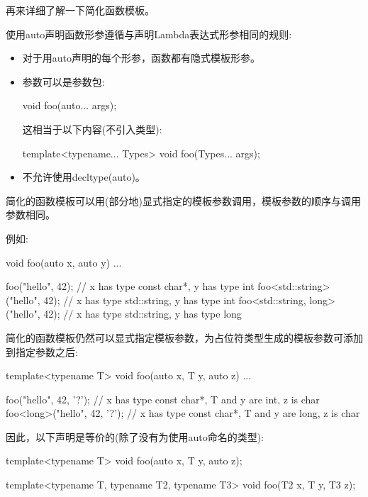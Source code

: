
再来详细了解一下简化函数模板。


使用auto声明函数形参遵循与声明Lambda表达式形参相同的规则:

\begin{itemize}
\item
对于用auto声明的每个形参，函数都有隐式模板形参。

\item
参数可以是参数包:
\begin{cpp}
void foo(auto... args);
\end{cpp}

这相当于以下内容(不引入类型):
\begin{cpp}
template<typename... Types>
void foo(Types... args);
\end{cpp}

\item
不允许使用decltype(auto)。
\end{itemize}

简化的函数模板可以用(部分地)显式指定的模板参数调用，模板参数的顺序与调用参数相同。

例如:

\begin{cpp}
void foo(auto x, auto y)
{
	...
}

foo("hello", 42); // x has type const char*, y has type int
foo<std::string>("hello", 42); // x has type std::string, y has type int
foo<std::string, long>("hello", 42); // x has type std::string, y has type long
\end{cpp}


简化的函数模板仍然可以显式指定模板参数，为占位符类型生成的模板参数可添加到指定参数之后:

\begin{cpp}
template<typename T>
void foo(auto x, T y, auto z)
{
	...
}

foo("hello", 42, '?'); // x has type const char*, T and y are int, z is char
foo<long>("hello", 42, '?'); // x has type const char*, T and y are long, z is char
\end{cpp}

因此，以下声明是等价的(除了没有为使用auto命名的类型):

\begin{cpp}
template<typename T>
void foo(auto x, T y, auto z);

template<typename T, typename T2, typename T3>
void foo(T2 x, T y, T3 z);
\end{cpp}


